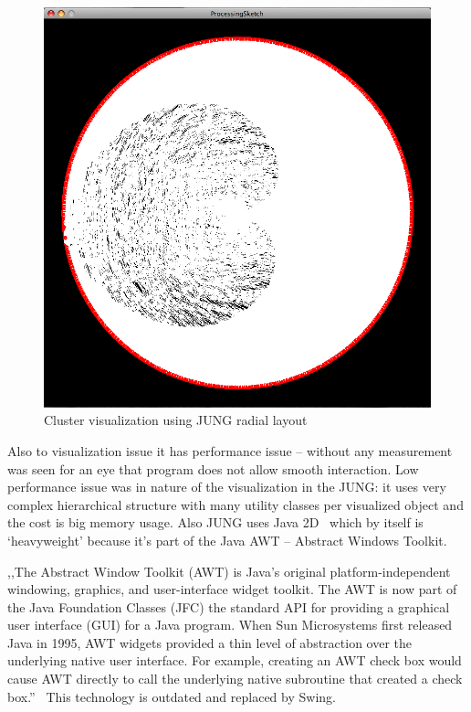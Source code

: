 \begin{figure}[h!]
\centering
\includegraphics[scale=0.4]{pictures/using_JUNG_radial.png}
\caption{Cluster visualization using JUNG radial layout}
\label{fig:JUNG_radial_layout}
\end{figure}


Also to visualization issue it has performance issue -- without any measurement was seen for an eye that program does not allow smooth interaction. Low performance issue was in nature of the visualization in the JUNG: it uses very complex hierarchical structure with many utility classes per visualized object and the cost is big memory usage. Also JUNG uses Java 2D~\cite{JAVA_2D} which by itself is `heavyweight' because it's part of the Java AWT -- Abstract Windows Toolkit.


,,The Abstract Window Toolkit (AWT) is Java's original platform-independent windowing, graphics, and user-interface widget toolkit. The AWT is now part of the Java Foundation Classes (JFC) the standard API for providing a graphical user interface (GUI) for a Java program. When Sun Microsystems first released Java in 1995, AWT widgets provided a thin level of abstraction over the underlying native user interface. For example, creating an AWT check box would cause AWT directly to call the underlying native subroutine that created a check box.''~\cite{JAVA_AWT} This technology is outdated and replaced by Swing.


